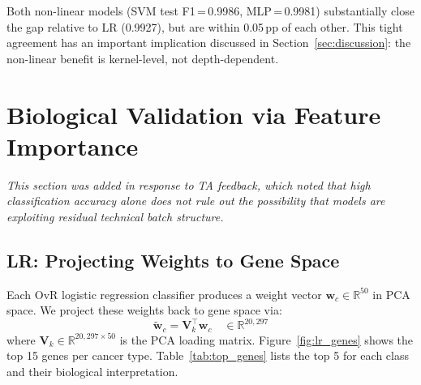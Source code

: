 \documentclass[11pt,letterpaper]{article}
\begin{document}
Both non-linear models (SVM test F1\,=\,0.9986, MLP\,=\,0.9981) substantially
close the gap relative to LR (0.9927), but are within 0.05\,pp of each other.
This tight agreement has an important implication discussed in
Section~\ref{sec:discussion}: the non-linear benefit is kernel-level, not
depth-dependent.

\section{Biological Validation via Feature Importance}
\label{sec:importance}

\emph{This section was added in response to TA feedback, which noted that
high classification accuracy alone does not rule out the possibility that
models are exploiting residual technical batch structure.}

\subsection{LR: Projecting Weights to Gene Space}

Each OvR logistic regression classifier produces a weight vector
$\mathbf{w}_c \in \mathbb{R}^{50}$ in PCA space.  We project these weights
back to gene space via:
\begin{equation}
  \tilde{\mathbf{w}}_c = \mathbf{V}_k^\top \mathbf{w}_c
  \quad \in \mathbb{R}^{20{,}297}
\end{equation}
where $\mathbf{V}_k \in \mathbb{R}^{20{,}297 \times 50}$ is the PCA loading
matrix.  Figure~\ref{fig:lr_genes} shows the top 15 genes per cancer type.
Table~\ref{tab:top_genes} lists the top 5 for each class and their biological
interpretation.
\end{document}
